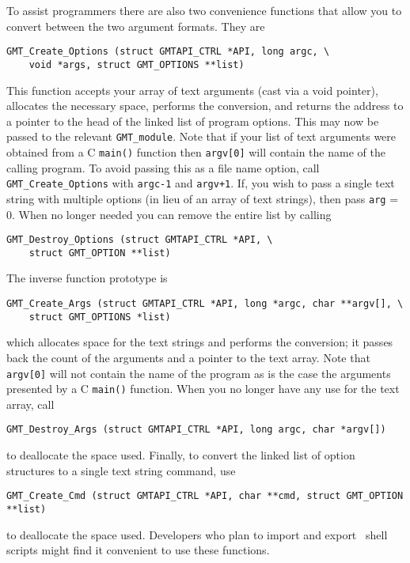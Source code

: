 \documentclass{report}
\begin{document}
To assist programmers there are also two convenience functions that
allow you to convert between the two argument formats.  They are

\begin{verbatim}
GMT_Create_Options (struct GMTAPI_CTRL *API, long argc, \
    void *args, struct GMT_OPTIONS **list)
\end{verbatim}
This function accepts your array of text arguments (cast via a void pointer), allocates the necessary
space, performs the conversion, and returns the address to a pointer to the
head of the linked list of program options.  This may now be passed to the
relevant \texttt{GMT\_module}.  Note that if your list of text arguments
were obtained from a C \texttt{main()} function then \texttt{argv[0]} will
contain the name of the calling program.  To avoid passing this as a file
name option, call \texttt{GMT\_Create\_Options} with \texttt{argc-1}
and \texttt{argv+1}.  If, you wish to pass a single text string with
multiple options (in lieu of an array of text strings), then pass \texttt{arg} = 0.
When no longer needed you can remove the entire list by calling
\begin{verbatim}
GMT_Destroy_Options (struct GMTAPI_CTRL *API, \
    struct GMT_OPTION **list)
\end{verbatim}
The inverse function prototype is
\begin{verbatim}
GMT_Create_Args (struct GMTAPI_CTRL *API, long *argc, char **argv[], \
    struct GMT_OPTIONS *list)
\end{verbatim}
\index{GMT\_Create\_Args}
which allocates space for the text strings and performs the conversion;
it passes back the count of the arguments and a pointer to the text array.
Note that \texttt{argv[0]} will not contain the name of the program as
is the case the arguments presented by a C \texttt{main()} function.
When you no longer have any use for the text array, call
\begin{verbatim}
GMT_Destroy_Args (struct GMTAPI_CTRL *API, long argc, char *argv[])
\end{verbatim}
to deallocate the space used.
Finally, to convert the linked list of option structures to a single
text string command, use
\begin{verbatim}
GMT_Create_Cmd (struct GMTAPI_CTRL *API, char **cmd, struct GMT_OPTION **list)
\end{verbatim}
to deallocate the space used.
Developers who plan to import and export \GMT\ shell scripts might find it
convenient to use these functions.
\end{document}
